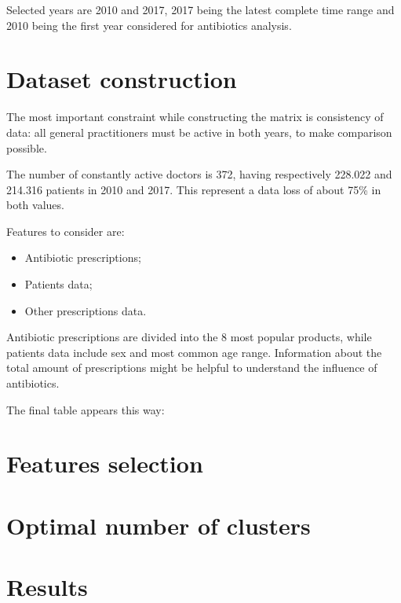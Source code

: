 Selected years are 2010 and 2017, 2017 being the latest complete time range and 2010 being the first year considered for antibiotics analysis.

\section{Dataset construction}
The most important constraint while constructing the matrix is consistency of data: all general practitioners must be active in both years, to make comparison possible.

The number of constantly active doctors is 372, having respectively 228.022 and 214.316 patients in 2010 and 2017. This represent a data loss of about 75\% in both values.

Features to consider are:
\begin{itemize}
	\item Antibiotic prescriptions;
	\item Patients data;
	\item Other prescriptions data.
\end{itemize}

Antibiotic prescriptions are divided into the 8 most popular products, while patients data include sex and most common age range. Information about the total amount of prescriptions might be helpful to understand the influence of antibiotics.

The final table appears this way:

\section{Features selection}

\section{Optimal number of clusters}

\section{Results}
